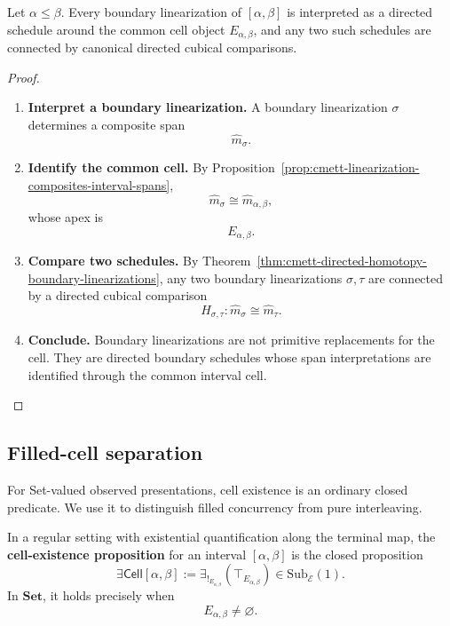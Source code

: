 \begin{theorem}
\label{thm:cmett-boundary-paths-common-cell}
    Let \(\alpha\leq\beta\). Every boundary linearization of
    \([\alpha,\beta]\) is interpreted as a directed schedule around the common
    cell object \(E_{\alpha,\beta}\), and any two such schedules are connected
    by canonical directed cubical comparisons.
\end{theorem}

\begin{proof}
    \leavevmode
    \begin{enumerate}
        \item \textbf{Interpret a boundary linearization.}
        A boundary linearization \(\sigma\) determines a composite span
        \[
            \widehat m_{\sigma}.
        \]

        \item \textbf{Identify the common cell.}
        By Proposition~\ref{prop:cmett-linearization-composites-interval-spans},
        \[
            \widehat m_{\sigma}\cong \widehat m_{\alpha,\beta},
        \]
        whose apex is
        \[
            E_{\alpha,\beta}.
        \]

        \item \textbf{Compare two schedules.}
        By Theorem~\ref{thm:cmett-directed-homotopy-boundary-linearizations},
        any two boundary linearizations \(\sigma,\tau\) are connected by a
        directed cubical comparison
        \[
            H_{\sigma,\tau}:\widehat m_\sigma\cong\widehat m_\tau.
        \]

        \item \textbf{Conclude.}
        Boundary linearizations are not primitive replacements for the cell.
        They are directed boundary schedules whose span interpretations are
        identified through the common interval cell.
    \end{enumerate}
\end{proof}

\subsection{Filled-cell separation}
\label{subsec:cmett-filled-cell-separation}

For Set-valued observed presentations, cell existence is an ordinary closed
predicate. We use it to distinguish filled concurrency from pure interleaving.

\begin{definition}
\label{def:cmett-cell-existence-proposition}
    In a regular setting with existential quantification along the terminal
    map, the \textbf{cell-existence proposition} for an interval
    \([\alpha,\beta]\) is the closed proposition
    \[
        \exists\mathsf{Cell}[\alpha,\beta]
        :=
        \exists_{!_{E_{\alpha,\beta}}}
        (\top_{E_{\alpha,\beta}})
        \in \mathrm{Sub}_{\mathcal E}(1).
    \]
    In \(\mathbf{Set}\), it holds precisely when
    \[
        E_{\alpha,\beta}\neq\varnothing.
    \]
\end{definition}

